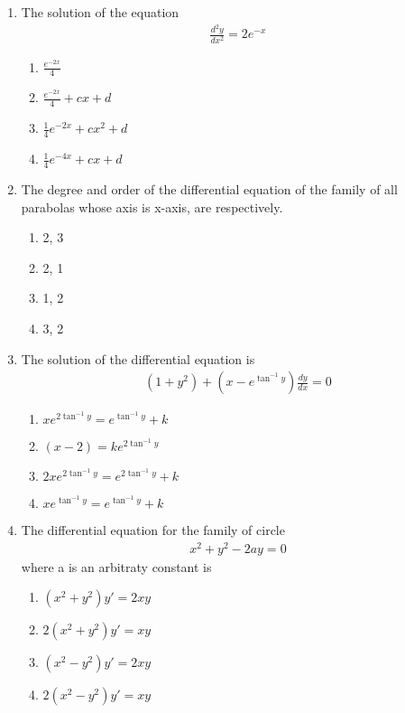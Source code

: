 \begin{enumerate}[label=\arabic*.,ref=\thesubsection.\theenumi]
\item The solution of the equation
\begin{align*}
\frac{d^{2}y}{dx^{2}} = 2e^{-x}
\end{align*}
\begin{enumerate}
\item $\frac{e^{-2x}}{4}$
\item $\frac{e^{-2x}}{4} + cx + d$
\item $\frac{1}{4}e^{-2x} + cx^{2} + d$
\item $\frac{1}{4}e^{-4x} + cx + d$
\end{enumerate}

\item The degree and order of the differential equation of the family of all parabolas whose axis is x-axis, are respectively.
\begin{enumerate}
\item 2, 3
\item 2, 1
\item 1, 2
\item 3, 2
\end{enumerate}

\item The solution of the differential equation is
\begin{align*}
(1 + y^{2}) + (x - e^{\tan^{-1}y})\frac{dy}{dx} = 0
\end{align*}
\begin{enumerate}
\item $xe^{2\tan^{-1}y} = e^{\tan^{-1}y} + k$
\item $(x - 2) = ke^{2\tan^{-1}y}$
\item $2xe^{2\tan^{-1}y} = e^{2\tan^{-1}y} + k$
\item $xe^{\tan^{-1}y} = e^{\tan^{-1}y} + k$
\end{enumerate}

\item The differential equation for the family of circle
\begin{align}
x^2 + y^2 -2ay = 0
\end{align}
where a is an arbitraty constant is
\begin{enumerate}
\item $(x^2 + y^2)y' = 2xy$
\item $2(x^2 + y^2)y' = xy$
\item $(x^2 - y^2)y' = 2xy$
\item $2(x^2 - y^2)y' = xy$
\end{enumerate}


\end{enumerate}
